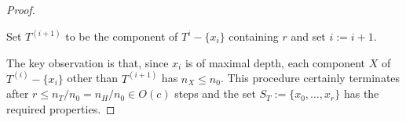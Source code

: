 \documentclass[kpfonts]{patmorin}
\DeclareMathOperator{\pw}{pw}
\theoremstyle{named}
\begin{document}
\begin{proof}
\begin{compactenum}
        \item Set $T^{(i+1)}$ to be the component of $T^i-\{x_i\}$ containing $r$ and set $i:=i+1$.
    \end{compactenum}
    The key observation is that, since $x_i$ is of maximal depth, each component $X$ of $T^{(i)}-\{x_i\}$ other than $T^{(i+1)}$ has $n_X\le n_0$.
    This procedure certainly terminates after $r\le n_T/n_0 = n_H/n_0 \in O(c)$ steps and the set $S_T:=\{x_0,\ldots,x_r\}$ has the required properties.

\end{proof}
\end{document}
